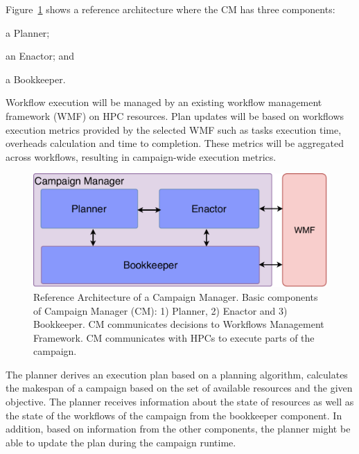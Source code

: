 Figure~\ref{fig:refarch} shows a reference architecture where the CM has three components:
\begin{inparaenum}[(1)]
    \item a Planner;
    \item an Enactor; and
    \item a Bookkeeper. 
\end{inparaenum}
Workflow execution will be managed by an existing workflow management framework (WMF) on HPC resources.
Plan updates will be based on workflows execution metrics provided by the selected WMF such as tasks execution time, overheads calculation and time to completion.
These metrics will be aggregated across workflows, resulting in campaign-wide execution metrics.

\begin{figure}[t]
    \centering
    \includegraphics[width=.95\textwidth]{figures/manager/CEM_design.pdf}
    \caption{Reference Architecture of a Campaign Manager. Basic 
        components of Campaign Manager (CM): 1) Planner, 2) Enactor and 3) Bookkeeper. 
        CM communicates decisions to Workflows Management Framework. CM communicates with HPCs to 
        execute parts of the campaign.}\label{fig:refarch}
\end{figure}

The planner derives an execution plan based on a planning algorithm, calculates the makespan of a campaign based on the set of available resources and the given objective. 
The planner receives information about the state of resources as well as the state of the workflows of the campaign from the bookkeeper component.
In addition, based on information from the other components, the planner might be able to update the plan during the campaign runtime. 

